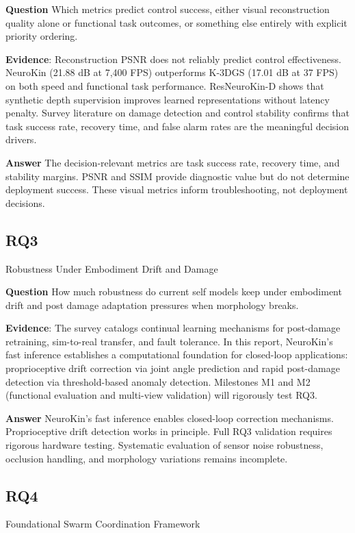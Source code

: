 ﻿\documentclass[11pt,a4paper]{article}
\begin{document}
\textbf{Question} Which metrics predict control success, either visual reconstruction quality alone or functional task outcomes, or something else entirely with explicit priority ordering.

\textbf{Evidence}: Reconstruction PSNR does not reliably predict control effectiveness. NeuroKin (21.88 dB at 7,400 FPS) outperforms K-3DGS (17.01 dB at 37 FPS) on both speed and functional task performance. ResNeuroKin-D shows that synthetic depth supervision improves learned representations without latency penalty. Survey literature on damage detection and control stability confirms that task success rate, recovery time, and false alarm rates are the meaningful decision drivers.

\textbf{Answer} The decision-relevant metrics are task success rate, recovery time, and stability margins. PSNR and SSIM provide diagnostic value but do not determine deployment success. These visual metrics inform troubleshooting, not deployment decisions.

\subsection{RQ3} Robustness Under Embodiment Drift and Damage

\textbf{Question} How much robustness do current self models keep under embodiment drift and post damage adaptation pressures when morphology breaks.

\textbf{Evidence}: The survey catalogs continual learning mechanisms for post-damage retraining, sim-to-real transfer, and fault tolerance. In this report, NeuroKin's fast inference establishes a computational foundation for closed-loop applications: proprioceptive drift correction via joint angle prediction and rapid post-damage detection via threshold-based anomaly detection. Milestones M1 and M2 (functional evaluation and multi-view validation) will rigorously test RQ3.

\textbf{Answer} NeuroKin's fast inference enables closed-loop correction mechanisms. Proprioceptive drift detection works in principle. Full RQ3 validation requires rigorous hardware testing. Systematic evaluation of sensor noise robustness, occlusion handling, and morphology variations remains incomplete.

\subsection{RQ4} Foundational Swarm Coordination Framework
\end{document}
